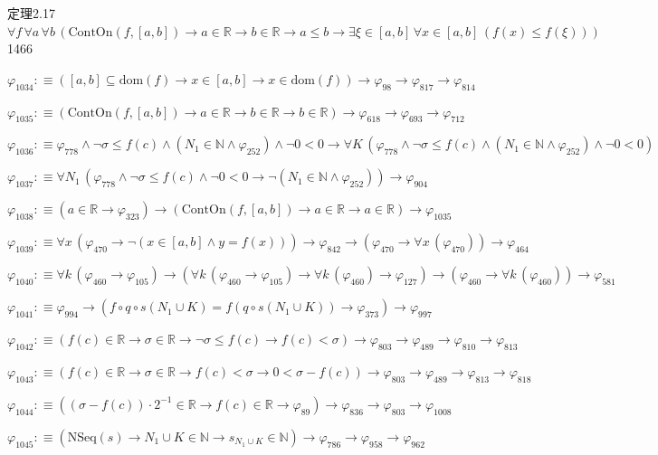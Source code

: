 \begin{fullproof}{定理2.17}{$\forall f\,\forall a\,\forall b\,(\mathrm{ContOn}(f,[a,b]) \to a \in \mathbb{R} \to b \in \mathbb{R} \to a \leq b \to \exists \xi \in [a,b]\,\forall x \in [a,b]\,(f(x) \leq f(\xi)))$}{1466}
\begin{abbrevlist}
\item $\varphi_{1034} :\equiv ([a,b] \subseteq \mathrm{dom}(f) \to x \in [a,b] \to x \in \mathrm{dom}(f)) \to \varphi_{98} \to \varphi_{817} \to \varphi_{814}$
\item $\varphi_{1035} :\equiv (\mathrm{ContOn}(f,[a,b]) \to a \in \mathbb{R} \to b \in \mathbb{R} \to b \in \mathbb{R}) \to \varphi_{618} \to \varphi_{693} \to \varphi_{712}$
\item $\varphi_{1036} :\equiv \varphi_{778} \land \neg \sigma \leq f(c) \land (N_{1} \in \mathbb{N} \land \varphi_{252}) \land \neg 0 < 0 \to \forall K\,(\varphi_{778} \land \neg \sigma \leq f(c) \land (N_{1} \in \mathbb{N} \land \varphi_{252}) \land \neg 0 < 0)$
\item $\varphi_{1037} :\equiv \forall N_{1}\,(\varphi_{778} \land \neg \sigma \leq f(c) \land \neg 0 < 0 \to \neg (N_{1} \in \mathbb{N} \land \varphi_{252})) \to \varphi_{904}$
\item $\varphi_{1038} :\equiv (a \in \mathbb{R} \to \varphi_{323}) \to (\mathrm{ContOn}(f,[a,b]) \to a \in \mathbb{R} \to a \in \mathbb{R}) \to \varphi_{1035}$
\item $\varphi_{1039} :\equiv \forall x\,(\varphi_{470} \to \neg (x \in [a,b] \land y = f(x))) \to \varphi_{842} \to (\varphi_{470} \to \forall x\,(\varphi_{470})) \to \varphi_{464}$
\item $\varphi_{1040} :\equiv \forall k\,(\varphi_{460} \to \varphi_{105}) \to (\forall k\,(\varphi_{460} \to \varphi_{105}) \to \forall k\,(\varphi_{460}) \to \varphi_{127}) \to (\varphi_{460} \to \forall k\,(\varphi_{460})) \to \varphi_{581}$
\item $\varphi_{1041} :\equiv \varphi_{994} \to (f \circ q \circ s(N_{1} \cup K) = f(q \circ s(N_{1} \cup K)) \to \varphi_{373}) \to \varphi_{997}$
\item $\varphi_{1042} :\equiv (f(c) \in \mathbb{R} \to \sigma \in \mathbb{R} \to \neg \sigma \leq f(c) \to f(c) < \sigma) \to \varphi_{803} \to \varphi_{489} \to \varphi_{810} \to \varphi_{813}$
\item $\varphi_{1043} :\equiv (f(c) \in \mathbb{R} \to \sigma \in \mathbb{R} \to f(c) < \sigma \to 0 < \sigma - f(c)) \to \varphi_{803} \to \varphi_{489} \to \varphi_{813} \to \varphi_{818}$
\item $\varphi_{1044} :\equiv ((\sigma - f(c)) \cdot 2^{-1} \in \mathbb{R} \to f(c) \in \mathbb{R} \to \varphi_{89}) \to \varphi_{836} \to \varphi_{803} \to \varphi_{1008}$
\item $\varphi_{1045} :\equiv (\mathrm{NSeq}(s) \to N_{1} \cup K \in \mathbb{N} \to s_{N_{1} \cup K} \in \mathbb{N}) \to \varphi_{786} \to \varphi_{958} \to \varphi_{962}$

\end{abbrevlist}
\end{fullproof}
